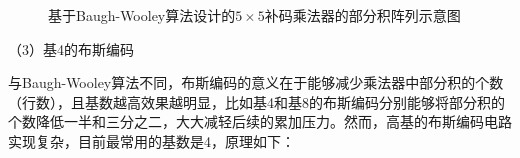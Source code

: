 \begin{figure}[!htb]
    \centering
\caption{基于Baugh-Wooley算法设计的$5 \times 5$补码乘法器的部分积阵列示意图}
\label{EM:Fig:signed_comp_P_Baugh-Wooley}
\end{figure}

（3）基4的布斯编码

与Baugh-Wooley算法不同，布斯编码的意义在于能够减少乘法器中部分积的个数（行数），且基数越高效果越明显，比如基4和基8的布斯编码分别能够将部分积的个数降低一半和三分之二\cite{EM:booth_Macsorley,EM:booth_proof}，大大减轻后续的累加压力。然而，高基的布斯编码电路实现复杂，目前最常用的基数是4，原理如下：

